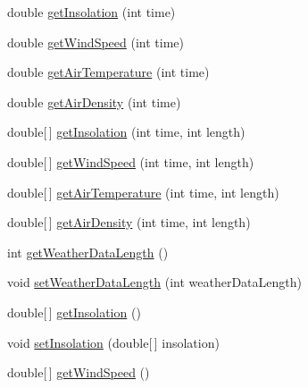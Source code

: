 \begin{DoxyCompactItemize}
double \hyperlink{classuk_1_1ac_1_1dmu_1_1iesd_1_1cascade_1_1context_1_1_cascade_context_a35d0a49067767cc10ce27e434ab4c473}{get\-Insolation} (int time)
\item 
double \hyperlink{classuk_1_1ac_1_1dmu_1_1iesd_1_1cascade_1_1context_1_1_cascade_context_a571b582128465fd5fda986ae707eff7f}{get\-Wind\-Speed} (int time)
\item 
double \hyperlink{classuk_1_1ac_1_1dmu_1_1iesd_1_1cascade_1_1context_1_1_cascade_context_a632dfee418048d1ace5a84c9085bee34}{get\-Air\-Temperature} (int time)
\item 
double \hyperlink{classuk_1_1ac_1_1dmu_1_1iesd_1_1cascade_1_1context_1_1_cascade_context_a05463b3e84e4bb2543531990486800f5}{get\-Air\-Density} (int time)
\item 
double\mbox{[}$\,$\mbox{]} \hyperlink{classuk_1_1ac_1_1dmu_1_1iesd_1_1cascade_1_1context_1_1_cascade_context_acb8f2a7f2a13b640f72fe6dfec9eba49}{get\-Insolation} (int time, int length)
\item 
double\mbox{[}$\,$\mbox{]} \hyperlink{classuk_1_1ac_1_1dmu_1_1iesd_1_1cascade_1_1context_1_1_cascade_context_a7a6b60d8bb13c2414186d4cbe5cbe786}{get\-Wind\-Speed} (int time, int length)
\item 
double\mbox{[}$\,$\mbox{]} \hyperlink{classuk_1_1ac_1_1dmu_1_1iesd_1_1cascade_1_1context_1_1_cascade_context_a17877180a642fc9367c63e7316980629}{get\-Air\-Temperature} (int time, int length)
\item 
double\mbox{[}$\,$\mbox{]} \hyperlink{classuk_1_1ac_1_1dmu_1_1iesd_1_1cascade_1_1context_1_1_cascade_context_a1d55b996f5b10cebc2ce080f39827d4c}{get\-Air\-Density} (int time, int length)
\item 
int \hyperlink{classuk_1_1ac_1_1dmu_1_1iesd_1_1cascade_1_1context_1_1_cascade_context_adf285ca227f78238170b0176070144e8}{get\-Weather\-Data\-Length} ()
\item 
void \hyperlink{classuk_1_1ac_1_1dmu_1_1iesd_1_1cascade_1_1context_1_1_cascade_context_a36e9e9d1156fe01ffdd7ab89b3e5a4ce}{set\-Weather\-Data\-Length} (int weather\-Data\-Length)
\item 
double\mbox{[}$\,$\mbox{]} \hyperlink{classuk_1_1ac_1_1dmu_1_1iesd_1_1cascade_1_1context_1_1_cascade_context_a6e3f599fbbffabc20fb5b223f5ac2583}{get\-Insolation} ()
\item 
void \hyperlink{classuk_1_1ac_1_1dmu_1_1iesd_1_1cascade_1_1context_1_1_cascade_context_a27f26e554a2398ca3c9e59a918d85372}{set\-Insolation} (double\mbox{[}$\,$\mbox{]} insolation)
\item 
double\mbox{[}$\,$\mbox{]} \hyperlink{classuk_1_1ac_1_1dmu_1_1iesd_1_1cascade_1_1context_1_1_cascade_context_a2b81611d14d688e3fbbca0e7ef96993b}{get\-Wind\-Speed} ()

\end{DoxyCompactItemize}
